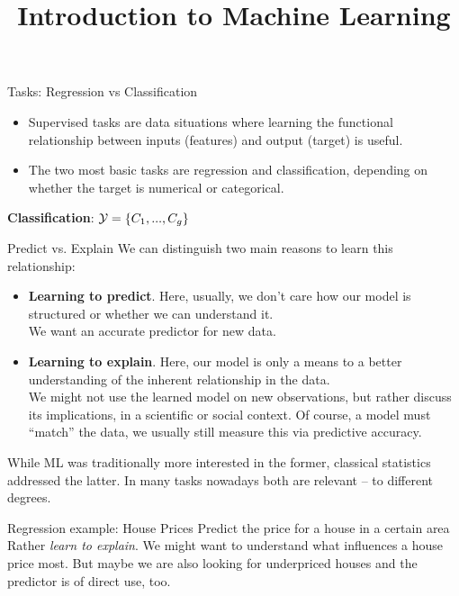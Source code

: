 \documentclass[11pt,compress,t,notes=noshow, xcolor=table]{beamer}
\title{Introduction to Machine Learning}
\begin{document}


\begin{frame}{Tasks: Regression vs Classification}
\begin{itemize}
  \item Supervised tasks are data situations where learning the functional relationship between inputs (features) and output (target) is useful.
  \item The two most basic tasks are regression and classification, depending on whether the target is numerical or categorical.
\end{itemize}  
\vfill
{}
{
\textbf{Classification}: $\mathcal{Y} = \{C_1,...,C_g\}$
}
\end{frame}


\begin{frame}{Predict vs. Explain}
We can distinguish two main reasons to learn this relationship:
\begin{itemize}
  \item \textbf{Learning to predict}. Here, usually, we don't care how our model is structured or whether we can understand it.\\
  We want an accurate predictor for new data.
  \item \textbf{Learning to explain}. Here, our model is only a means to a better understanding of the inherent relationship in the data.\\
  We might not use the learned model on new observations, but rather discuss its implications, in a scientific or social context.
  Of course, a model must ``match'' the data, we usually still measure this via predictive accuracy. 
\end{itemize}  
\vfill
While ML was traditionally more interested in the former, classical statistics
addressed the latter. In many tasks nowadays both are relevant -- to different degrees.
\end{frame}


\begin{frame}{Regression example: House Prices}
Predict the price for a house in a certain area
\vfill
{} %
\vfill
{} %
\vfill
Rather \textit{learn to explain}. We might want to understand what influences a house price most.
But maybe we are also looking for underpriced houses and the predictor is of direct use, too.
\end{frame}
\end{document}
